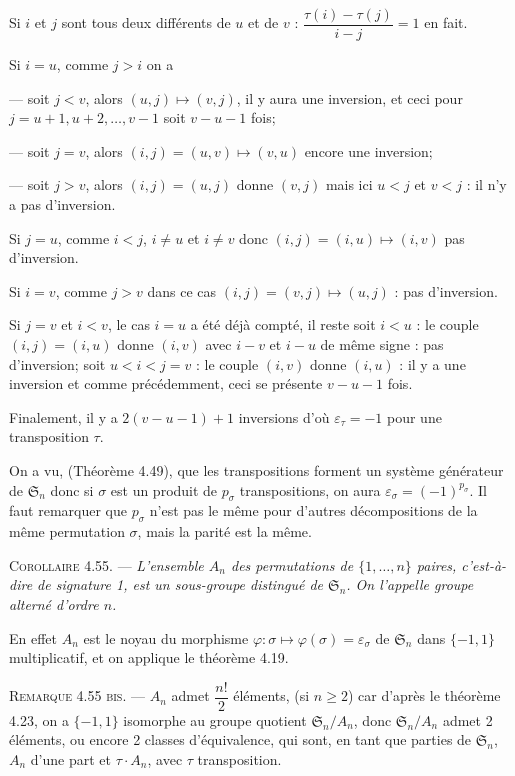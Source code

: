 Si $i$ et $j$ sont tous deux différents de $u$ et de $v$ : $\dfrac{\tau(i)-\tau(j)}{i-j}=1$ en fait.

Si $i=u$, comme $j>i$ on a

--- soit $j<v$, alors $(u,j)\mapsto(v,j)$, il y aura une inversion, et ceci pour $j=u+1,u+2,\ldots,v-1$ soit $v-u-1$ fois;

--- soit $j=v$, alors $(i,j)=(u,v)\mapsto(v,u)$ encore une inversion;

--- soit $j>v$, alors $(i,j)=(u,j)$ donne $(v,j)$ mais ici $u<j$ et $v<j$ : il n'y a pas d'inversion.

Si $j=u$, comme $i<j$, $i\ne u$ et $i\ne v$ donc $(i,j)=(i,u)\mapsto(i,v)$ pas d'inversion.

Si $i=v$, comme $j>v$ dans ce cas $(i,j)=(v,j)\mapsto(u,j)$ : pas d'inversion.

Si $j=v$ et $i<v$, le cas $i=u$ a été déjà compté, il reste soit $i<u$ : le couple $(i,j)=(i,u)$ donne $(i,v)$ avec $i-v$ et $i-u$ de même signe : pas d'inversion; soit $u<i<j=v$ : le couple $(i,v)$ donne $(i,u)$ : il y a une inversion et comme précédemment, ceci se présente $v-u-1$ fois.

Finalement, il y a $2(v-u-1)+1$ inversions d'où $\varepsilon_\tau=-1$ pour une transposition $\tau$.

On a vu, (Théorème 4.49), que les transpositions forment un système générateur de $\mathfrak S_n$ donc si $\sigma$ est un produit de $p_\sigma$ transpositions, on aura $\varepsilon_\sigma=(-1)^{p_\sigma}$. Il faut remarquer que $p_\sigma$ n'est pas le même pour d'autres décompositions de la même permutation $\sigma$, mais la parité est la même. \bookend

\medskip\noindent\textsc{Corollaire 4.55.} --- \emph{L'ensemble $A_n$ des permutations de $\{1,\ldots,n\}$ paires, c'est-à-dire de signature 1, est un sous-groupe distingué de $\mathfrak S_n$. On l'appelle groupe alterné d'ordre $n$.}

En effet $A_n$ est le noyau du morphisme $\varphi:\sigma\mapsto\varphi(\sigma)=\varepsilon_\sigma$ de $\mathfrak S_n$ dans $\{-1,1\}$ multiplicatif, et on applique le théorème 4.19. \bookend

\medskip\noindent\textsc{Remarque 4.55 bis.} --- $A_n$ admet $\dfrac{n!}{2}$ éléments, (si $n\ge2$) car d'après le théorème 4.23, on a $\{-1,1\}$ isomorphe au groupe quotient $\mathfrak S_n/A_n$, donc $\mathfrak S_n/A_n$ admet 2 éléments, ou encore 2 classes d'équivalence, qui sont, en tant que parties de $\mathfrak S_n$, $A_n$ d'une part et $\tau\cdot A_n$, avec $\tau$ transposition.

